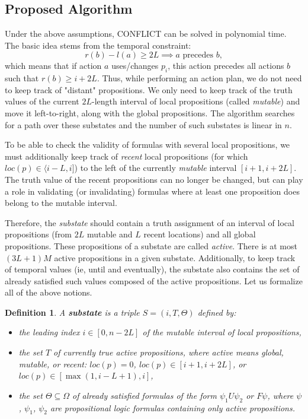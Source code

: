 \documentclass[]{jair}
\newtheorem{Definition}{Definition}
\begin{document}
\subsection{Proposed Algorithm}\label{pa}

Under the above assumptions, CONFLICT can be solved in polynomial time. 
The basic idea stems from the temporal constraint:
    $$r(b)-l(a)\ge 2L \implies a \text{ precedes } b,$$ which means
that if action \( a \) uses/changes \( p_i \),
this action precedes all actions \( b \) such that \( r(b) \geq i + 2L \).
Thus, while performing an action plan, we do not need to keep track of "distant" propositions.
We only need to keep track of the truth values of the current $2L$-length interval of
local propositions (called {\it mutable})
and move it left-to-right, along with the global propositions.
The algorithm searches for a path over these substates and the number of such substates is linear in $n$. 

To be able to check the validity of formulas with several local propositions, we must additionally keep track of {\it recent} local propositions (for which $loc(p)\in\langle i-L,i]$) to the left of the currently {\it mutable} interval $[i+1, i+2L]$. The truth value of the recent propositions can no longer be changed, but can play a role in validating (or invalidating) formulas where at least one proposition does belong to the mutable interval.

    Therefore, the {\it substate} should contain a truth assignment of an interval of local propositions (from $2L$ mutable and $L$ recent locations) and all global propositions. These propositions of a substate are called {\it active}. There is at most $(3L+1)M$ active propositions in a given substate.
    Additionally, to keep track of temporal values (ie, until and eventually), 
the substate also contains the set of already satisfied such values composed of the active propositions.
Let us formalize all of the above notions.

\begin{Definition}
    A {\bf substate} is a triple $S=(i, T, \Theta)$ defined by:
\begin{itemize}
    \item the leading index $i\in [0, n-2L]$ of the mutable interval of local propositions,
    \item the set $T$ of currently true active propositions, where {\it active} means global, mutable, or recent: $loc(p)=0$, $loc(p)\in[i+1,i+2L]$, or $loc(p)\in[\max(1, i-L+1), i]$,
    \item the set $\Theta \subseteq \Omega$ of already satisfied formulas of the form $\psi_1 U \psi_2$ or $F\psi$, where $\psi$, $\psi_1$, $\psi_2$ are propositional logic formulas containing only active propositions.
\end{itemize}
\end{Definition}
\end{document}
